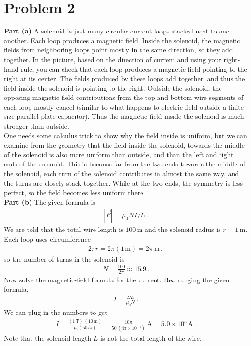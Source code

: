 \documentclass[11pt]{article}
\begin{document}
\newpage
\section*{Problem 2}

\noindent\textbf{Part (a)} A solenoid is just many circular current loops stacked next to one another. Each loop produces a magnetic field. Inside the solenoid, the magnetic fields from neighboring loops point mostly in the same direction, so they add together. In the picture, based on the direction of current and using your right-hand rule, you can check that each loop produces a magnetic field pointing to the right at its center. The fields produced by these loops add together, and thus the field inside the solenoid is pointing to the right.  Outside the solenoid, the opposing magnetic field contributions from the top and bottom wire segments of each loop mostly cancel (similar to what happens to electric field outside a finite-size parallel-plate capacitor). Thus the magnetic field inside the solenoid is much stronger than outside.\\

One needs some calculus trick to show why the field inside is uniform, but we can examine from the geometry that the field inside the solenoid, towards the middle of the solenoid is also more uniform than outside, and than the left and right ends of the solenoid. This is because far from the two ends towards the middle of the solenoid, each turn of the solenoid contributes in almost the same way, and the turns are closely stack together. While at the two ends, the symmetry is less perfect, so the field becomes less uniform there.\\

\noindent\textbf{Part (b)} The given formula is
\begin{align*}
|\vec{B}| = \mu_0 NI/L\,.
\end{align*}
We are told that the total wire length is $100$\,m and the solenoid radius is $r=1$\,m. Each loop uses circumference
\begin{align*}
2\pi r = 2\pi(1\,\text{m}) = 2\pi\,\text{m}\,,
\end{align*}
so the number of turns in the solenoid is
\begin{align*}
N = \frac{100}{2\pi}\approx 15.9\,.
\end{align*}
Now solve the magnetic-field formula for the current. Rearranging the given formula,
\begin{align*}
I = \frac{BL}{\mu_0 N}\,.
\end{align*}
We can plug in the numbers to get
\begin{align*}
I = \frac{(1\,\text{T})\,(10\,\text{m})}{\mu_0(50/\pi)}
= \frac{10\pi}{50\,(4\pi\times 10^{-7})}\,\text{A}
= 5.0\times 10^5\,\text{A}\,.
\end{align*}
Note that the solenoid length $L$ is not the total length of the wire.\\
\end{document}
